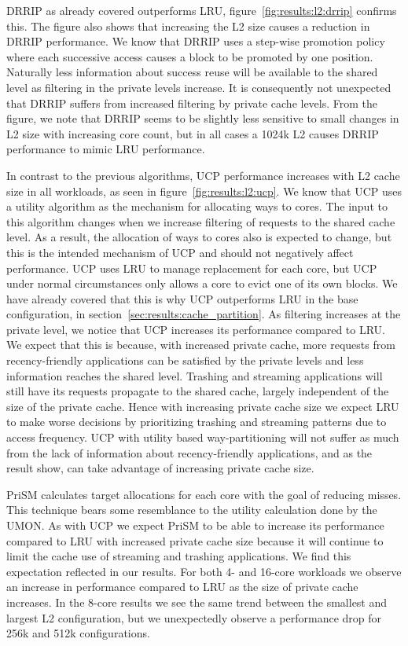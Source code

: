 DRRIP as already covered outperforms LRU, figure~\ref{fig:results:l2:drrip} confirms this.
The figure also shows that increasing the L2 size causes a reduction in DRRIP performance.
We know that DRRIP uses a step-wise promotion policy where each successive access causes a block to be promoted by one position.
Naturally less information about success reuse will be available to the shared level as filtering in the private levels increase.
It is consequently not unexpected that DRRIP suffers from increased filtering by private cache levels.
From the figure, we note that DRRIP seems to be slightly less sensitive to small changes in L2 size with increasing core count, but in all cases a 1024k L2 causes DRRIP performance to mimic LRU performance.

In contrast to the previous algorithms, UCP performance increases with L2 cache size in all workloads, as seen in figure~\ref{fig:results:l2:ucp}.
We know that UCP uses a utility algorithm as the mechanism for allocating ways to cores. 
The input to this algorithm changes when we increase filtering of requests to the shared cache level.
As a result, the allocation of ways to cores also is expected to change, but this is the intended mechanism of UCP and should not negatively affect performance.
UCP uses LRU to manage replacement for each core, but UCP under normal circumstances only allows a core to evict one of its own blocks. 
We have already covered that this is why UCP outperforms LRU in the base configuration, in section~\ref{sec:results:cache_partition}. 
As filtering increases at the private level, we notice that UCP increases its performance compared to LRU. 
We expect that this is because, with increased private cache, more requests from recency-friendly applications can be satisfied by the private levels and less information reaches the shared level.
Trashing and streaming applications will still have its requests propagate to the shared cache, largely independent of the size of the private cache. 
Hence with increasing private cache size we expect LRU to make worse decisions by prioritizing trashing and streaming patterns due to access frequency.
UCP with utility based way-partitioning will not suffer as much from the lack of information about recency-friendly applications, and as the result show, can take advantage of increasing private cache size.

PriSM calculates target allocations for each core with the goal of reducing misses.
This technique bears some resemblance to the utility calculation done by the UMON.
As with UCP we expect PriSM to be able to increase its performance compared to LRU with increased private cache size because it will continue to limit the cache use of streaming and trashing applications.
We find this expectation reflected in our results.
For both 4- and 16-core workloads we observe an increase in performance compared to LRU as the size of private cache increases.
In the 8-core results we see the same trend between the smallest and largest L2 configuration, but we unexpectedly observe a performance drop for 256k and 512k configurations. 

